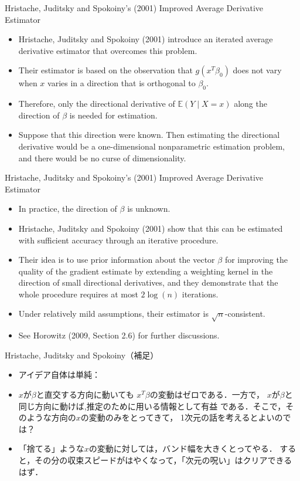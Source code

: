 \documentclass[xcolor=svgnames,dvipdfmx,cjk]{beamer}
\theoremstyle{example}
\def\E{\mathbb{E}}
\begin{document}
\begin{frame}{Hristache, Juditsky and Spokoiny's (2001) Improved Average Derivative Estimator}
\begin{itemize}
  \item Hristache, Juditsky and Spokoiny (2001) introduce an iterated average derivative estimator that overcomes this problem.
  \item Their estimator is based on the observation that $g(x^T\beta_0)$ does not vary 
        when $x$ varies in a direction that is orthogonal to $\beta_0$.
  \item Therefore, only the directional derivative of $\E(Y \mid X = x)$ along the direction of $\beta$ is needed for estimation.
  \item Suppose that this direction were known. 
        Then estimating the directional derivative would be a one-dimensional nonparametric estimation problem,
        and there would be no curse of dimensionality.
\end{itemize}
\end{frame}

\begin{frame}{Hristache, Juditsky and Spokoiny's (2001) Improved Average Derivative Estimator}
\begin{itemize}
  \item In practice, the direction of $\beta$ is unknown.
  \item Hristache, Juditsky and Spokoiny (2001) show that this can be estimated with sufficient accuracy 
        through \alert{an iterative procedure}.
  \item Their idea is to use prior information about the vector $\beta$
        for improving the quality of the gradient estimate 
        by extending a weighting kernel in the direction of small directional derivatives,
        and they demonstrate that the whole procedure requires at most $2 \log (n)$ iterations.
  \item Under relatively mild assumptions, their estimator is $\sqrt{n}$-consistent.
  \item See Horowitz (2009, Section 2.6) for further discussions.
\end{itemize}
\end{frame}

\begin{frame}{Hristache, Juditsky and Spokoiny（補足）}
\begin{itemize}
  \item アイデア自体は単純：
  \item $x$が$\beta$と直交する方向に動いても
        $x^T\beta$の変動はゼロである．一方で，
        $x$が$\beta$と同じ方向に動けば,推定のために用いる情報として有益
        である．そこで，そのような方向の$x$の変動のみをとってきて，
        1次元の話を考えるとよいのでは？
  \item 「捨てる」ような$x$の変動に対しては，バンド幅を大きくとってやる．
        すると，その分の収束スピードがはやくなって，「次元の呪い」はクリアできるはず．
\end{itemize}
\end{frame}
\end{document}

